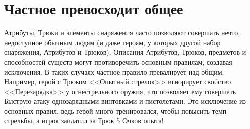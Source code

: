 \section{Частное превосходит общее}
Атрибуты, Трюки и элементы снаряжения часто позволяют совершать нечто, недоступное обычным людям (и даже героям, у которых другой набор снаряжения, Атрибутов и Трюков). Описания Атрибутов, Трюков, предметов и способностей существ могут противоречить основным правилам, создавая исключения. В таких случаях частное правило превалирует над общим. Например, герой с Трюком <<Опытный стрелок>> игнорирует свойство <<Перезарядка>> у огнестрельного оружия, что позволяет ему совершать Быструю атаку однозарядными винтовками и пистолетами. Это исключение из основных правил, ведь герой много тренировался, чтобы повысить темп стрельбы, а игрок заплатил за Трюк 5 Очков опыта!